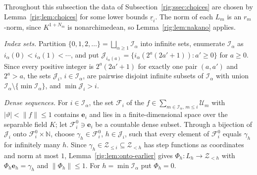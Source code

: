 \documentclass[11pt]{amsart}
\theoremstyle{definition}
\theoremstyle{remark}
\numberwithin{equation}{section}
\newcommand{\N}{\mathbb N}
\newcommand{\abs}[1]{\lvert #1\rvert}
\newcommand{\norm}[1]{\lVert #1\rVert}
\theoremstyle{plain}
\theoremstyle{definition}
\theoremstyle{plain}
\begin{document}
Throughout this subsection the data of Subsection~\ref{rig:ssec:choices} are chosen by Lemma~\ref{rig:lem:choices} for
some lower bounds $\underline r_i$. The norm of each $L_m$ is an $r_m$\nobreakdash-norm, since $K^{1+N_m}$ is
nonarchimedean, so Lemma~\ref{rig:lem:nakano} applies.

\emph{Index sets.} Partition $\{0,1,2,\dots\}=\bigsqcup_{\alpha\ge1}\mathcal I_\alpha$ into infinite sets, enumerate
$\mathcal I_\alpha$ as $i_\alpha(0)<i_\alpha(1)<\cdots$, and put $\mathcal J_{i_\alpha(a)}=\{i_\alpha(2^a(2a'+1)):a'\ge0\}$
for $a\ge0$. Since every positive integer is $2^a(2a'+1)$ for exactly one pair $(a,a')$ and $2^a>a$, the sets
$\mathcal J_i$, $i\in\mathcal I_\alpha$, are pairwise disjoint infinite subsets of $\mathcal I_\alpha$ with union
$\mathcal I_\alpha\setminus\{\min\mathcal I_\alpha\}$, and $\min\mathcal J_i>i$.

\emph{Dense sequences.} For $i\in\mathcal I_\alpha$, the set $\mathcal F_i$ of the
$f\in\sum_{m\in\mathcal I_\alpha,\,m\le i}\mathcal U_m$ with $\abs\vartheta<\norm f\le1$ contains $\mathbf e_i$ and lies
in a finite-dimensional space over the separable field $K$; let $\mathcal F^0_i\ni\mathbf e_i$ be a countable dense
subset. Through a bijection of $\mathcal J_i$ onto $\mathcal F^0_i\times\N$, choose $\gamma_h\in\mathcal F^0_i$,
$h\in\mathcal J_i$, such that every element of $\mathcal F^0_i$ equals $\gamma_h$ for infinitely many $h$. Since
$\gamma_h\in\mathcal Z_{\le i}\subseteq\mathcal Z_{<h}$ has step functions as coordinates and norm at most $1$,
Lemma~\ref{rig:lem:onto-earlier} gives $\Phi_h\colon L_h\to\mathcal Z_{<h}$ with $\Phi_h\mathbf e_h=\gamma_h$ and
$\norm{\Phi_h}\le1$. For $h=\min\mathcal I_\alpha$ put $\Phi_h=0$.
\end{document}

